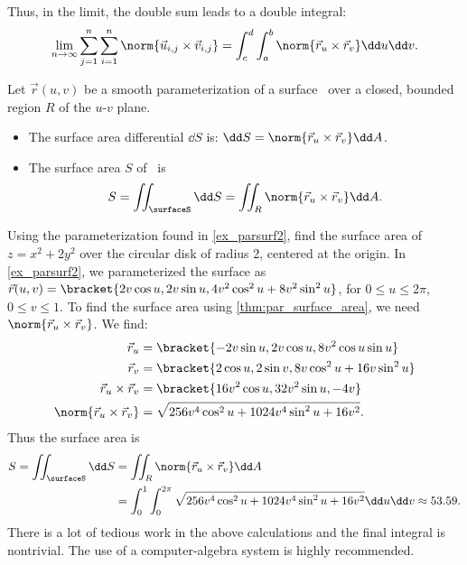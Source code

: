 Thus, in the limit, the double sum leads to a double integral:
\[
\lim_{n\to\infty} \sum_{j=1}^n\sum_{i=1}^n \norm{\vec u_{i,j}\times \vec v_{i,j}}
= \int_c^d\int_a^b \norm{\vec r_u\times\vec r_v}\dd u\dd v.
\]

\begin{theorem}\label{thm:par_surface_area}
Let $\vec r(u,v)$ be a smooth parameterization of a surface \surfaceS\ over a closed, bounded region $R$ of the $u$-$v$ plane. 
\begin{itemize}
\item	The surface area differential $\dd S$ is: $\dd S = \norm{\vec r_u\times \vec r_v}\dd A$.
\item The surface area $S$ of \surfaceS\ is
\[S = \iint_\surfaceS\dd S = \iint_R \norm{\vec r_u\times \vec r_v}\dd A.\]
\end{itemize}
\end{theorem}


\begin{example}\label{ex_parsurfarea1}
Using the parameterization found in \autoref{ex_parsurf2}, find the surface area of $z=x^2+2y^2$ over the circular disk of radius 2, centered at the origin.
\solution
In \autoref{ex_parsurf2}, we parameterized the surface as $\vec r(u,v) =\\ \bracket{2v\cos u, 2v\sin u, 4v^2\cos^2u+8v^2\sin^2u}$, for $0\leq u\leq 2\pi$, $0\leq v\leq 1$. To find the surface area using \autoref{thm:par_surface_area}, we need $\norm{\vec r_u\times\vec r_v}$. We find:
\begin{align*}
\vec r_u &= \bracket{-2v\sin u, 2v\cos u, 8v^2\cos u\sin u}\\
\vec r_v &= \bracket{2\cos u, 2\sin v, 8v\cos^2 u+16v\sin^2u}\\
\vec r_u\times\vec r_v &= \bracket{16v^2\cos u, 32v^2\sin u, -4v}\\
\norm{\vec r_u\times\vec r_v} &= \sqrt{256v^4\cos^2u+1024v^4\sin^2u+16v^2}.
\end{align*}
Thus the surface area is
\begin{align*}
S = \iint_\surfaceS \dd S &= \iint_R\norm{\vec r_u\times \vec r_v}\dd A \\
& = \int_0^1\int_0^{2\pi} \sqrt{256v^4\cos^2u+1024v^4\sin^2u+16v^2}\dd u\dd v \approx 53.59.
\end{align*}
There is a lot of tedious work in the above calculations and the final integral is nontrivial. The use of a computer-algebra system is highly recommended.
\end{example}

